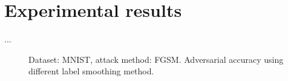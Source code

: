 \section{Experimental results}
...

\begin{figure}%
    \centering
    \quad
    \caption{Dataset: MNIST, attack method: FGSM. Adversarial accuracy using different label smoothing method.}%
    \label{fig:example}%
\end{figure}